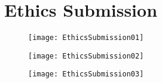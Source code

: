\chapter{Ethics Submission}


\begin{figure}[!ht]
  \texttt{[image: EthicsSubmission01]}
\end{figure}
\begin{figure}[!ht]
  \texttt{[image: EthicsSubmission02]}
\end{figure}
\begin{figure}[!ht]
  \texttt{[image: EthicsSubmission03]}
\end{figure}
